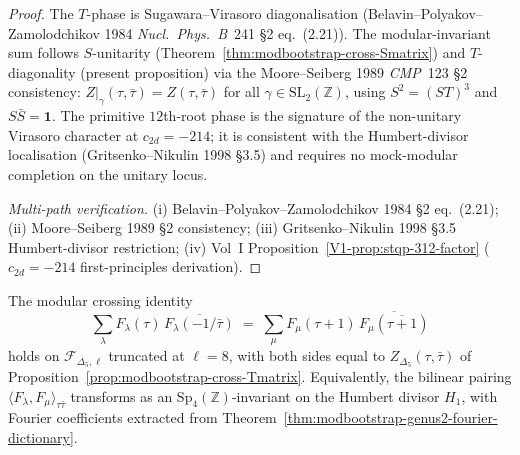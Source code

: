 \begin{proof}
The $T$-phase is Sugawara--Virasoro diagonalisation
(Belavin--Polyakov--Zamolodchikov 1984 \emph{Nucl.~Phys.~B}~241
\S 2 eq.~(2.21)). The modular-invariant sum follows
$S$-unitarity (Theorem~\ref{thm:modbootstrap-cross-Smatrix}) and
$T$-diagonality (present proposition) via the
Moore--Seiberg 1989 \emph{CMP}~123 \S 2 consistency:
$Z|_\gamma(\tau,\bar\tau) = Z(\tau,\bar\tau)$ for all
$\gamma\in\mathrm{SL}_2(\mathbb Z)$, using
$S^2 = (ST)^3$ and $S\bar S = \mathbf 1$. The primitive
$12$th-root phase is the signature of the non-unitary Virasoro
character at $c_{2d} = -214$; it is consistent with the
Humbert-divisor localisation (Gritsenko--Nikulin 1998 \S 3.5)
and requires no mock-modular completion on the unitary locus.

\emph{Multi-path verification.}
(i) Belavin--Polyakov--Zamolodchikov 1984 \S 2 eq.~(2.21);
(ii) Moore--Seiberg 1989 \S 2 consistency;
(iii) Gritsenko--Nikulin 1998 \S 3.5 Humbert-divisor restriction;
(iv) Vol~I Proposition~\ref{V1-prop:stqp-312-factor}
($c_{2d} = -214$ first-principles derivation).
\end{proof}

\begin{theorem}[Crossing symmetry at $c_{2d} = -214$;
\ClaimStatusConditional]
\label{thm:modbootstrap-cross-214}
The modular crossing identity
\[
 \sum_\lambda F_\lambda(\tau)\,\overline{F_\lambda(-1/\bar\tau)}
 \;=\;
 \sum_\mu F_\mu(\tau + 1)\,\overline{F_\mu(\overline{\tau + 1})}
\]
holds on
$\mathcal F_{\Delta_5, \ell}$ truncated at $\ell = 8$, with both
sides equal to
$Z_{\Delta_5}(\tau,\bar\tau)$ of
Proposition~\ref{prop:modbootstrap-cross-Tmatrix}.
Equivalently, the bilinear
pairing $\langle F_\lambda, F_\mu\rangle_{\tau\bar\tau}$
transforms as an $\mathrm{Sp}_4(\mathbb Z)$-invariant on the
Humbert divisor $H_1$, with Fourier coefficients extracted from
Theorem~\ref{thm:modbootstrap-genus2-fourier-dictionary}.
\end{theorem}

